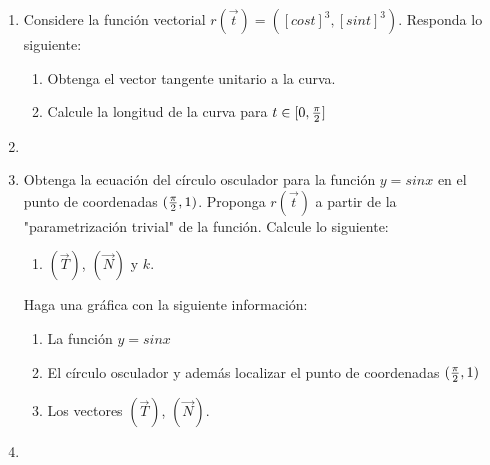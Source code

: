 \documentclass[10pt,letterpaper,fleqn]{article}
\begin{document}
\begin{enumerate}
        \item Considere la función vectorial $r(\overrightarrow{t})= ([cos t]^3,[sin t]^3)$. Responda lo siguiente:
        \begin{enumerate}
            \item Obtenga el vector tangente unitario a la curva.
            \item Calcule la longitud de la curva para $t \in [0,{\pi \over 2}]$
        \end{enumerate}

        \item

        \item Obtenga la ecuación del círculo osculador para la función $y=sin x$ en el punto de coordenadas $({\pi \over 2},1)$. Proponga $r(\overrightarrow{t})$ a partir de la "parametrización trivial" de la función. Calcule lo siguiente: 
        \begin{enumerate}
            \item $(\overrightarrow{T})$, $(\overrightarrow{N})$ y $k$.
        \end{enumerate}
        Haga una gráfica con la siguiente información:
        \begin{enumerate}
            \item La función $y=sin x$
            \item El círculo osculador y además localizar el punto de coordenadas $({\pi \over 2},1)$
            \item Los vectores $(\overrightarrow{T})$, $(\overrightarrow{N})$.
        \end{enumerate}

        \item 


    \end{enumerate}
\end{document}
